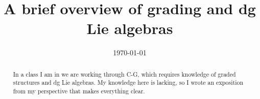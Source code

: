 \documentclass[A4, 11pt]{report}
\title{A brief overview of grading and dg Lie algebras}
\date{\today}
\begin{document}
\maketitle
\tableofcontents

\begin{abstract}
	In a class I am in we are working through C-G, which requires knowledge of graded structures and dg Lie algebras. My knowledge here is lacking, so I wrote an exposition from my perspective that makes everything clear.
\end{abstract}










\end{document}
